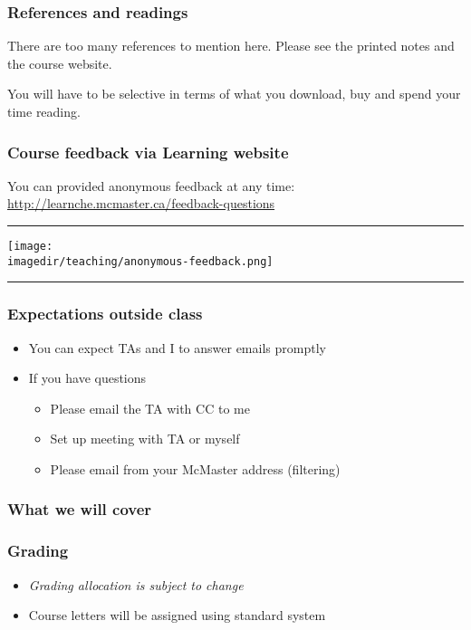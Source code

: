\begin{frame}\frametitle{References and readings}
	\vspace{12pt}

	There are too many references to mention here. Please see the printed notes and the course website.
	
	\vspace{12pt}
	
	You will have to be selective in terms of what you download, buy and spend your time reading.
\end{frame}

\begin{frame}\frametitle{Course feedback via Learning website}
	You can provided anonymous feedback at any time:
	\href{http://learnche.mcmaster.ca/feedback-questions}{http://learnche.mcmaster.ca/feedback-questions}
	\vspace{12pt}
	\hrule
	\begin{center}
		\texttt{[image: \\imagedir/teaching/anonymous-feedback.png]}
	\end{center}
	\hrule
\end{frame}

\begin{frame}\frametitle{Expectations outside class}
	\begin{itemize}
		\item	You can expect TAs and I to answer emails promptly
		\item	If you have questions
			\begin{itemize}
				\item	Please email the TA with CC to me 
				\item	Set up meeting with TA or myself
				\item	Please email from your McMaster address (filtering)
			\end{itemize}
	\end{itemize}
\end{frame}

\begin{frame}\frametitle{What we will cover}
\end{frame}

\begin{frame}\frametitle{Grading}
	
	\begin{itemize}
		\item	\emph{Grading allocation is subject to change}
		\item	Course letters will be assigned using standard system
	\end{itemize}
\end{frame}

